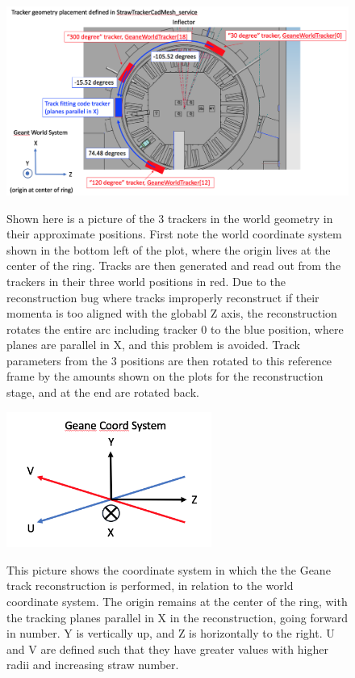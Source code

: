 \documentclass{article}
\begin{document}
\begin{figure}[h]
\caption{Shown here is a picture of the 3 trackers in the world geometry in their approximate positions. First note the world coordinate system shown in the bottom left of the plot, where the origin lives at the center of the ring. Tracks are then generated and read out from the trackers in their three world positions in red. Due to the reconstruction bug where tracks improperly reconstruct if their momenta is too aligned with the globabl Z axis, the reconstruction rotates the entire arc including tracker 0 to the blue position, where planes are parallel in X, and this problem is avoided. Track parameters from the 3 positions are then rotated to this reference frame by the amounts shown on the plots for the reconstruction stage, and at the end are rotated back.}
\centering
\includegraphics[width=1.0\textwidth]{WorldCoordSys}
\label{fig:WorldCoordSys}
\end{figure}

\begin{figure}[h]
\caption{This picture shows the coordinate system in which the the Geane track reconstruction is performed, in relation to the world coordinate system. The origin remains at the center of the ring, with the tracking planes parallel in X in the reconstruction, going forward in number. Y is vertically up, and Z is horizontally to the right. U and V are defined such that they have greater values with higher radii and increasing straw number.}
\centering
\includegraphics[width=0.6\textwidth]{GeaneCoordSys}
\label{fig:GeaneCoordSys}
\end{figure}
\end{document}
